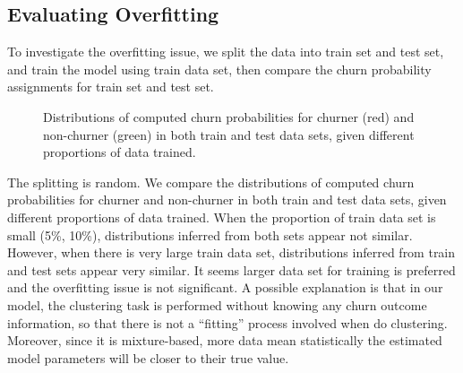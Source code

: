 \subsection{Evaluating Overfitting}

To investigate the overfitting issue, we split the data into train set and test set, and train the model using train data set, then compare the churn probability assignments for train set and test set.

\begin{figure}[!h]
\centering
	\hspace{0mm}
	\hspace{0mm}
\caption{Distributions of computed churn probabilities for churner (red) and non-churner (green) in both train and test data sets, given different proportions of data trained.}
\label{eq:overfitting}
\end{figure}

The splitting is random. We compare the distributions of computed churn probabilities for churner and non-churner in both train and test data sets, given different proportions of data trained. When the proportion of train data set is small (5\%, 10\%), distributions inferred from both sets appear not similar. However, when there is very large train data set, distributions inferred from train and test sets appear very similar. It seems larger data set for training is preferred and the overfitting issue is not significant. A possible explanation is that in our model, the clustering task is performed without knowing any churn outcome information, so that there is not a ``fitting'' process involved when do clustering. Moreover, since it is mixture-based, more data mean statistically the estimated model parameters will be closer to their true value.